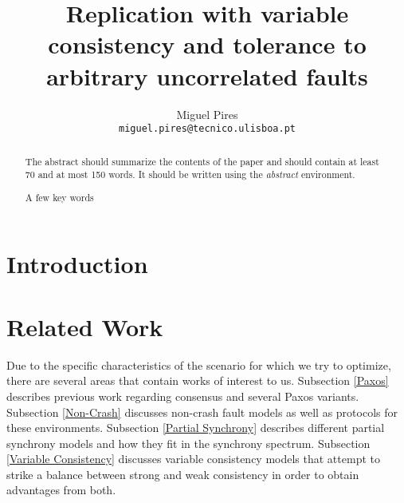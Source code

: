 \documentclass[runningheads,a4paper]{llncs}
\newcommand{\keywords}[1]{\par\addvspace\baselineskip
\noindent\keywordname\enspace\ignorespaces#1}
\begin{document}
\mainmatter  %

\title{Replication with variable consistency and tolerance to arbitrary uncorrelated faults}


\author{Miguel Pires \\
\texttt{miguel.pires@tecnico.ulisboa.pt}}



%
%

\maketitle


\begin{abstract}
The abstract should summarize the contents of the paper and should
contain at least 70 and at most 150 words. It should be written using the
\emph{abstract} environment.
\keywords{A few key words}
\end{abstract}

\section{Introduction}

\section{Related Work}

Due to the specific characteristics of the scenario for which we try to optimize, there are several areas that contain works of interest to us. Subsection \ref{Paxos} describes previous work regarding consensus and several Paxos variants. Subsection \ref{Non-Crash} discusses non-crash fault models as well as protocols for these environments. Subsection \ref{Partial Synchrony} describes different partial synchrony models and how they fit in the synchrony spectrum. Subsection \ref{Variable Consistency} discusses variable consistency models that attempt to strike a balance between strong and weak consistency in order to obtain advantages from both.
\end{document}
